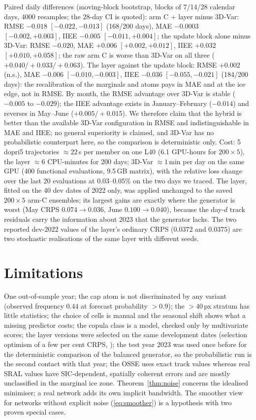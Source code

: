 \documentclass[11pt]{article}
\begin{document}
Paired daily differences (moving-block bootstrap, blocks of 7/14/28 calendar days, 4000 resamples; the 28-day CI is quoted): arm C + layer minus 3D-Var: RMSE $-0.018$ $[-0.022,-0.013]$ (168/200 days), MAE $-0.0003$ $[-0.002,+0.003]$, IIEE $-0.005$ $[-0.011,+0.004]$; the update block alone minus 3D-Var: RMSE $-0.020$, MAE $+0.006$ $[+0.002,+0.012]$, IIEE $+0.032$ $[+0.010,+0.058]$; the raw arm C is worse than 3D-Var on all three ($+0.040/+0.033/+0.063$). The layer against the update block: RMSE $+0.002$ (n.s.), MAE $-0.006$ $[-0.010,-0.003]$, IIEE $-0.036$ $[-0.055,-0.021]$ (184/200 days): the recalibration of the marginals and atoms pays in MAE and at the ice edge, not in RMSE. By month, the RMSE advantage over 3D-Var is stable ($-0.005$ to $-0.029$); the IIEE advantage exists in January--February ($-0.014$) and reverses in May--June ($+0.005/+0.015$). We therefore claim that the hybrid is better than the available 3D-Var configuration in RMSE and indistinguishable in MAE and IIEE; no general superiority is claimed, and 3D-Var has no probabilistic counterpart here, so the comparison is deterministic only. Cost: 5 dopri5 trajectories $\approx22$\,s per member on one L40 (6.1 GPU-hours for $200\times5$), the layer $\approx6$ CPU-minutes for 200 days; 3D-Var $\approx1$\,min per day on the same GPU (400 functional evaluations, 9.5\,GB matrix), with the relative loss change over the last 20 evaluations at $0.03$--$0.05\%$ on the two days we traced. The layer, fitted on the 40 dev dates of 2022 only, was applied unchanged to the saved $200\times5$ arm-C ensembles; its largest gains are exactly where the generator is worst (May CRPS $0.074\to0.036$, June $0.100\to0.040$), because the day-$d$ track residuals carry the information about 2023 that the generator lacks. The two reported dev-2022 values of the layer's ordinary CRPS ($0.0372$ and $0.0375$) are two stochastic realisations of the same layer with different seeds.


\section{Limitations}
One out-of-sample year; the cap atom is not discriminated by any variant (observed frequency $0.44$ at forecast probability $>0.9$); the $>40$\,px stratum has little statistics; the choice of cells is manual and the seasonal shift shows what a missing predictor costs; the copula class is a model, checked only by multivariate scores; the layer versions were selected on the same development dates (selection optimism of a few per cent CRPS, \citealp{cawley2010}); the test year 2023 was used once before for the deterministic comparison of the balanced generator, so the probabilistic run is the second contact with that year; the OSSE uses exact track values whereas real SRAL values have SIC-dependent, spatially coherent errors and are mostly unclassified in the marginal ice zone. Theorem~\ref{thm:noise} concerns the idealised minimiser; a real network adds its own implicit bandwidth. The smoother view for networks without explicit noise (\ref{eq:smoother}) is a hypothesis with two proven special cases.
\end{document}
